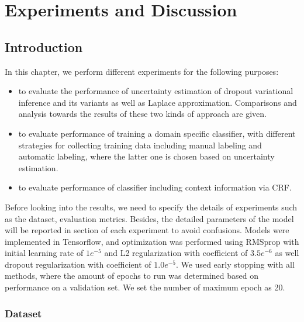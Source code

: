 
\chapter{Experiments and Discussion}

\section{Introduction}
In this chapter, we perform different experiments for the following purposes:
\begin{itemize}
	\item to evaluate the performance of uncertainty estimation of dropout variational inference and its variants as well as Laplace approximation. Comparisons and analysis towards the results of these two kinds of approach are given.
	
	\item to evaluate performance of training a domain specific classifier, with different strategies for collecting training data including manual labeling and automatic labeling, where the latter one is chosen based on uncertainty estimation.
	
	\item to evaluate performance of classifier including context information via CRF.
\end{itemize}

Before looking into the results, we need to specify the details of experiments such as the dataset, evaluation metrics. Besides, the detailed parameters of the model will be reported in section of each experiment to avoid confusions. Models were implemented in Tensorflow\cite{abadi2016tensorflow}, and optimization was performed using RMSprop with initial learning rate of $1e^{-5}$ and L2 regularization with coefficient of $3.5e^{-6}$ as well dropout regularization with coefficient of $1.0e^{-5}$. We used early stopping with all methods, where the amount of epochs to run was determined based on performance on a validation set. We set the number of maximum epoch as 20.

\subsection{Dataset}
